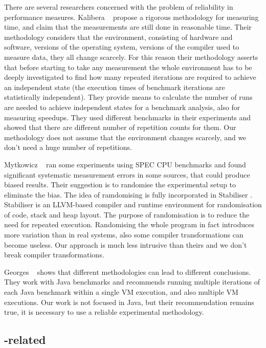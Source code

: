
There are several researchers concerned with the problem of reliability in performance measures. Kalibera \etal\ \cite{Kalibera2013} propose a rigorous methodology for measuring time, and claim that the measurements are still done in reasonable time. Their methodology considers that the environment, consisting of hardware and software, versions of the operating system, versions of the compiler used to measure data, they all change scarcely. For this reason their methodology asserts that before starting to take any measurement the whole environment has to be deeply investigated to find how many repeated iterations are required to achieve an independent state (the execution times of benchmark iterations are statistically independent). They provide means to calculate the number of runs are needed to achieve independent states for a benchmark analysis, also for measuring speedups. They used different benchmarks in their experiments and showed that there are different number of repetition counts for them. Our methodology does not assume that the environment changes scarcely, and we don't need a huge number of repetitions.

Mytkowicz \etal\ \cite{Mytkowicz2009} ran some experiments using SPEC CPU benchmarks and found significant systematic measurement errors in some sources, that could produce biased results. Their suggestion is to randomise the experimental setup to eliminate the bias. The idea of ramdomising is fully incorporated in Stabiliser \cite{Curtsinger2013}. Stabiliser is an LLVM-based compiler and runtime environment for randomisation of code, stack and heap layout. The purpose of randomisation is to reduce the need for repeated execution. Randomising the whole program in fact introduces more variation than in real systems, also some compiler transformations can become useless. Our approach is much less intrusive than theirs and we don't break compiler transformations.

Georges \etal\ \cite{Georges2007} shows that different methodologies can lead to different conclusions. They work with Java benchmarks and recommends running multiple iterations of each Java benchmark within a single VM execution, and also multiple VM executions. Our work is not focused in Java, but their recommendation remains true, it is necessary to use a reliable experimental methodology.


\subsection{\FDO-related}

